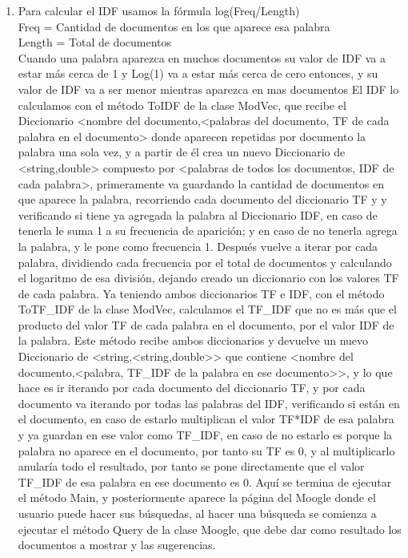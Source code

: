 \documentclass[12pt, a4paper]{article}
\begin{document}
\begin{enumerate}
    \item Para calcular el IDF usamos la fórmula log(Freq/Length)\\
          Freq = Cantidad de documentos en los que aparece esa palabra\\
          Length = Total de documentos\\
          Cuando una palabra aparezca en muchos documentos su valor de IDF va a estar más cerca de 1 y Log(1) va a estar más cerca de cero entonces, y su valor de IDF va a ser menor mientras aparezca en mas documentos
          El IDF lo calculamos con el método ToIDF de la clase ModVec, que recibe el Diccionario <nombre del documento,<palabras del documento, TF de cada palabra en el documento> donde aparecen repetidas por documento la palabra una sola vez, y a partir de él crea un nuevo Diccionario de <string,double> compuesto por <palabras de todos los documentos, IDF de cada palabra>, primeramente va guardando la cantidad de documentos en que aparece la palabra, recorriendo cada documento del diccionario TF y y verificando si tiene ya agregada la palabra al Diccionario IDF, en caso de tenerla le suma 1 a su frecuencia de aparición; y en caso de no tenerla agrega la palabra, y le pone como frecuencia 1. Después vuelve a iterar por cada palabra, dividiendo cada frecuencia por el total de documentos y calculando el logaritmo de esa división, dejando creado un diccionario con los valores TF de cada palabra.
          Ya teniendo ambos diccionarios TF e IDF, con el método ToTF\_IDF de la clase ModVec,
          calculamos el TF\_IDF que no es más que el producto del valor TF de cada palabra
          en el documento, por el valor IDF de la palabra. Este método recibe ambos diccionarios y
          devuelve un nuevo Diccionario de <string,<string,double>> que contiene
          <nombre del documento,<palabra, TF\_IDF de la palabra en ese documento>>,
          y lo que hace es ir iterando por cada documento del diccionario TF, y por cada documento
          va iterando por todas las palabras del IDF, verificando si están en el documento,
          en caso de estarlo multiplican el valor TF*IDF de esa palabra y ya guardan en ese
          valor como TF\_IDF, en caso de no estarlo es porque la palabra no aparece en el documento,
          por tanto su TF es 0, y al multiplicarlo anularía todo el resultado, por tanto se
          pone directamente que el valor TF\_IDF de esa palabra en ese documento es 0.
          Aquí se termina de ejecutar el método Main, y posteriormente aparece la página del Moogle
          donde el usuario puede hacer sus búsquedas, al hacer una búsqueda se comienza a ejecutar
          el método Query de la clase Moogle, que debe dar como resultado los documentos a mostrar y
          las sugerencias.


\end{enumerate}
\end{document}
